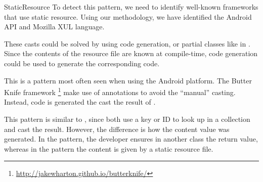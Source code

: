 \begin{pattern}{StaticResource}
\detection{}
To detect this pattern, we need to identify well-known frameworks that use static resource.
Using our methodology,
we have identified the Android API and Mozilla XUL language.

\discussion{}
%
%
These casts could be solved by using code generation,
or partial classes like in \csharp{}.
Since the contents of the resource file are known at compile-time,
code generation could be used to generate the corresponding \java{} code.

This is a pattern most often seen when using the Android platform.
The Butter Knife framework%
\footnote{\url{http://jakewharton.github.io/butterknife/}}
make use of annotations to avoid the ``manual'' casting.
Instead, code is generated the cast the result of .
%

\related{}
This pattern is similar to ,
since both use a key or ID to look up in a collection and cast the result.
However, the difference is how the content value was generated.
In the  pattern,
the developer ensures in another class the return value,
whereas in the \thisp{} pattern the content is given by a static resource file.
%
%

\end{pattern}